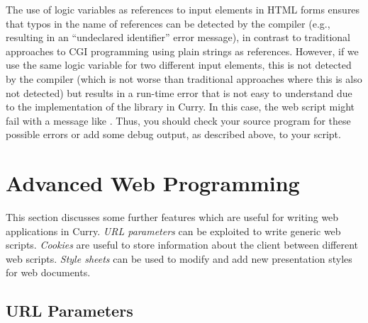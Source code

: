 
The use of logic variables as references to input elements
in HTML forms ensures that typos in the name of references
can be detected by the compiler (e.g., resulting in an
``undeclared identifier'' error message), in contrast
to traditional approaches to CGI programming using plain strings
as references.
However, if we use the same logic variable for two different
input elements, this is not detected by the compiler
(which is not worse than traditional approaches where this
is also not detected) but results in a run-time error
that is not easy to understand due to the implementation
of the library  in Curry.
In this case, the web script might fail with a message like
.
Thus, you should check your source program for these possible errors
or add some debug output, as described above, to your script.


\section{Advanced Web Programming}
\label{sec-advanced-web-programming}

This section discusses some further features which are useful
for writing web applications in Curry.
\emph{URL parameters} can be exploited to write generic web scripts.
\emph{Cookies} are useful to store information about the client
between different web scripts.
\emph{Style sheets} can be used to modify and add new presentation styles
for web documents.


\subsection{URL Parameters}

